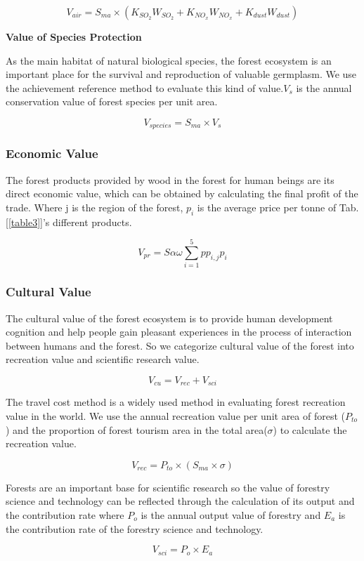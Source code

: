\begin{equation}
V_{air}= S_{ma} \times (K_{SO_{2}}W_{SO_{2}} + K_{NO_{x}}W_{NO_{x}}+ K_{dust}W_{dust})
\end{equation}

\textbf{Value of Species Protection}

As the main habitat of natural biological species, the forest ecosystem is an important place for the survival and reproduction of valuable germplasm.  We use the achievement reference method to evaluate this kind of value.$V_{s}$ is the annual conservation value of forest species per unit area.

\begin{equation}
V_{species} = S_{ma} \times V_{s}
\end{equation}

\subsubsection{Economic Value}

The forest products provided by wood in the forest for human beings are its direct economic value, which can be obtained by calculating the final profit of the trade. Where j is the region of the forest, $p_i$ is the average price per tonne of Tab. [\ref{table3}]'s different products.

\begin{equation}
V_{pr} =  S\alpha \omega \sum_{i=1}^5 pp_{i,j}p_{i}
\end{equation}

\subsubsection{Cultural Value}

The cultural value of the forest ecosystem is to provide human development cognition and help people gain pleasant experiences in the process of interaction between humans and the forest. So we categorize cultural value of the forest into recreation value and scientific research value.

\begin{equation}
V_{cu} = V_{rec} + V_{sci}
\end{equation}

The travel cost method is a widely used method in evaluating forest recreation value in the world. We use the annual recreation value per unit area of forest ($P_{to}$) and the proportion of forest tourism area in the total area($\sigma$) to calculate the recreation value.

\begin{equation}
V_{rec} = P_{to}\times (S_{ma} \times \sigma)
\end{equation}

Forests are an important base for scientific research so the value of forestry science and technology can be reflected through the calculation of its output and the contribution rate where  $P_o$ is the annual output value of forestry and $E_{a}$ is the contribution rate of the forestry science and technology.

\begin{equation}
V_{sci} = P_{o} \times E_{a}
\end{equation}